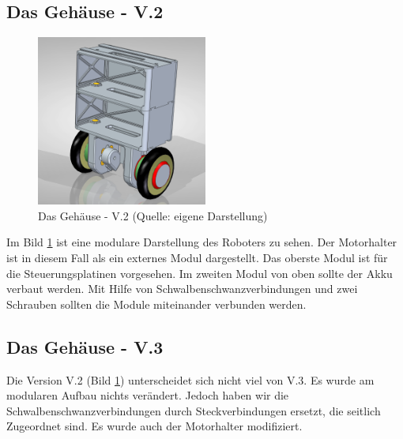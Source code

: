 \subsection{Das Gehäuse - V.2}
\begin{figure}[!h]  %
	\centering\includegraphics[width=0.5\textwidth]{images/gehaeuse-v2.png}
	\caption{Das Gehäuse - V.2 \newline (Quelle: eigene Darstellung)}
	\label{gehaeuse-v2} %
\end{figure}
Im Bild \ref{gehaeuse-v2} ist eine modulare Darstellung des Roboters zu sehen. Der Motorhalter ist in diesem Fall als ein externes Modul dargestellt. Das oberste Modul ist für die Steuerungsplatinen vorgesehen. Im zweiten Modul von oben sollte  der Akku verbaut werden. Mit Hilfe von Schwalbenschwanzverbindungen und zwei Schrauben sollten die Module miteinander verbunden werden.

\subsection{Das Gehäuse - V.3}

Die Version V.2 (Bild \ref{gehaeuse-v2}) unterscheidet sich nicht viel von V.3. Es wurde am modularen Aufbau nichts verändert. Jedoch haben wir die Schwalbenschwanzverbindungen durch Steckverbindungen ersetzt, die seitlich Zugeordnet sind. Es wurde auch der Motorhalter modifiziert.

